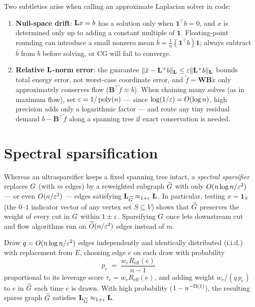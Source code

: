 \begin{trapbox}
Two subtleties arise when calling an approximate Laplacian solver in code:
\begin{enumerate}
  \item \textbf{Null-space drift}: $\mathbf{L} x = b$ has a solution only when $\mathbf{1}^\top b = 0$, and $x$ is determined only up to adding a constant multiple of $\mathbf{1}$. Floating-point rounding can introduce a small nonzero mean $\bar{b} = \frac{1}{n}(\mathbf{1}^\top b)\mathbf{1}$; always subtract $\bar{b}$ from $b$ before solving, or CG will fail to converge.
  \item \textbf{Relative $\mathbf{L}$-norm error}: the guarantee $\lVert\tilde{x}-\mathbf{L}^{+}b\rVert_{\mathbf{L}}\le\varepsilon\lVert\mathbf{L}^{+}b\rVert_{\mathbf{L}}$ bounds total energy error, not worst-case coordinate error, and $\tilde{f} = \mathbf{W}\mathbf{B}\tilde{x}$ only approximately conserves flow ($\mathbf{B}^\top\tilde{f} \approx b$). When chaining many solves (as in maximum flow), set $\varepsilon = 1/\operatorname{poly}(n)$ --- since $\log(1/\varepsilon) = O(\log n)$, high precision adds only a logarithmic factor --- and route any tiny residual demand $b - \mathbf{B}^\top\tilde{f}$ along a spanning tree if exact conservation is needed.
\end{enumerate}
\end{trapbox}

\section{Spectral sparsification}\label{ch41:sparsify}

Whereas an ultrasparsifier keeps a fixed spanning tree intact, a \emph{spectral sparsifier} replaces $G$ (with $m$ edges) by a reweighted subgraph $\widetilde{G}$ with only $O(n\log n/\varepsilon^2)$ --- or even $O(n/\varepsilon^2)$ --- edges satisfying $\mathbf{L}_{\widetilde{G}}\approx_{1+\varepsilon}\mathbf{L}$. In particular, testing $x = \mathbf{1}_S$ (the $0$--$1$ indicator vector of any vertex set $S \subseteq V$) shows that $\widetilde{G}$ preserves the weight of every cut in $G$ within $1 \pm \varepsilon$. Sparsifying $G$ once lets downstream cut and flow algorithms run on $\widetilde{O}(n/\varepsilon^2)$ edges instead of $m$.

\begin{theorem}\label{ch41:thm-ss}
Draw $q=O(n\log n/\varepsilon^2)$ edges independently and identically distributed (i.i.d.) with replacement from $E$, choosing edge $e$ on each draw with probability
\[
  p_e \;=\; \frac{w_e R_{\mathrm{eff}}(e)}{n-1}
\]
proportional to its leverage score $\tau_e = w_e R_{\mathrm{eff}}(e)$, and adding weight $w_e/(q\,p_e)$ to $e$ in $\widetilde{G}$ each time $e$ is drawn. With high probability ($1 - n^{-\Omega(1)}$), the resulting sparse graph $\widetilde{G}$ satisfies $\mathbf{L}_{\widetilde{G}}\approx_{1+\varepsilon}\mathbf{L}$.
\end{theorem}

